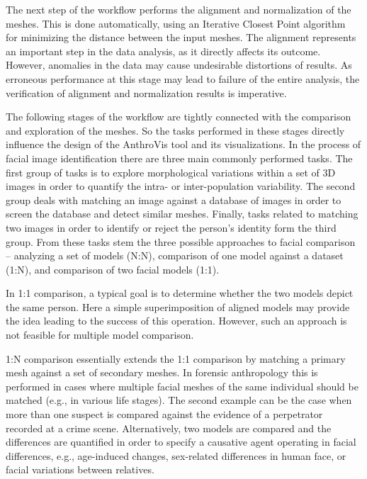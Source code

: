 \documentclass[final,5p,times]{elsarticle}
\begin{document}
The next step of the workflow performs the alignment and normalization of the meshes. 
This is done automatically, using an Iterative Closest Point algorithm~\cite{besl1992method} for minimizing the distance between the input meshes.
The alignment represents an important step in the data analysis, as it directly affects its outcome.
However, anomalies in the data may cause undesirable distortions of results. 
As erroneous performance at this stage may lead to failure of the entire analysis, the verification of alignment and normalization results is imperative.

The following stages of the workflow are tightly connected with the comparison and exploration of the meshes.
So the tasks performed in these stages directly influence the design of the AnthroVis tool and its visualizations.
In the process of facial image identification there are three main commonly performed tasks.
The first group of tasks is to explore morphological variations within a set of 3D images in order to quantify the intra- or inter-population variability.
The second group deals with matching an image against a database of images in order to screen the database and detect similar meshes.
Finally, tasks related to matching two images in order to identify or reject the person's identity form the third group.
From these tasks stem the three possible approaches to facial comparison -- analyzing a set of models (N:N), comparison of one model against a dataset (1:N), and comparison of two facial models (1:1). 

In 1:1 comparison, a typical goal is to determine whether the two models depict the same person. 
Here a simple superimposition of aligned models may provide the idea leading to the success of this operation.
However, such an approach is not feasible for multiple model comparison.

1:N comparison essentially extends the 1:1 comparison by matching a primary mesh against a set of secondary meshes. 
In forensic anthropology this is performed in cases where multiple facial meshes of the same individual should be matched (e.g., in various life stages).
The second example can be the case when more than one suspect is compared against the evidence of a perpetrator recorded at a crime scene. 
Alternatively, two models are compared and the differences are quantified in order to specify a causative agent operating in facial differences, e.g., age-induced changes, sex-related differences in human face, or facial variations between relatives.
\end{document}
